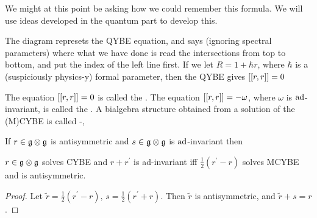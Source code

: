 \documentclass{article}
\begin{document}
\begin{aside}
We might at this point be asking how we could remember this formula. We will use ideas developed in the quantum part to develop this. 
\begin{center}
\end{center}
The diagram represets the QYBE equation, and says (ignoring spectral parameters)
where what we have done is read the intersections from top to bottom, and put the index of the left line first. If we let $R = 1 + \hbar r$, where $\hbar$ is a (suspiciously physics-y) formal parameter, then the QYBE gives $\dcomm[r]{r} = 0 $  
\end{aside}

\begin{definition}\label{def:CQIS:YBE}
The equation $\comm[[r]{r]}=0$ is called the . The equation $\comm[[r]{r]}=-\omega$, where $\omega$ is $\ad$-invariant, is called the . A bialgebra structure obtained from a solution of the (M)CYBE is called -,  
\end{definition}

\begin{lemma}
If $r \in \mf{g} \otimes \mf{g}$ is antisymmetric and $s \in \mf{g} \otimes \mf{g}$ is $\ad$-invariant then 
\end{lemma}
\begin{corollary}
$r \in \mf{g} \otimes \mf{g}$ solves CYBE and $r + r^\prime$ is ad-invariant iff $\frac{1}{2}(r^\prime-r)$ solves MCYBE and is antisymmetric.  
\end{corollary}
\begin{proof}
Let $\tilde{r} = \frac{1}{2}(r^\prime - r), \, s = \frac{1}{2}(r^\prime + r)$. Then $\tilde{r}$ is antisymmetric, and $\tilde{r}+s = r$. 
\end{proof}
\end{document}
